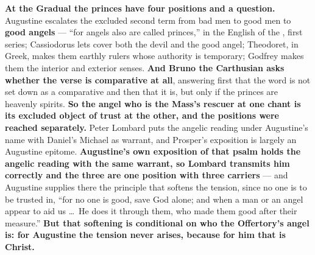 \textbf{At the Gradual the princes have four positions and a question.}
Augustine escalates the excluded second term from bad men to good men to
\textbf{good angels} --- ``for angels also are called princes,'' in the English
of the , first series; Cassiodorus lets
 cover both the devil and the good angel; Theodoret, in Greek,
makes them earthly rulers whose authority is temporary; Godfrey makes them the
interior and exterior senses. \textbf{And Bruno the Carthusian asks whether the
verse is comparative at all}, answering first that the word is not set down as a
comparative and then that it is, but only if the princes are heavenly spirits. \textbf{So the angel who is the Mass's rescuer at
one chant is its excluded object of trust at the other, and the positions were
reached separately.} Peter Lombard puts the angelic reading under Augustine's
name with Daniel's Michael as warrant, and Prosper's exposition is largely an
Augustine epitome. \textbf{Augustine's own exposition of that psalm holds the
angelic reading with the same warrant, so Lombard transmits him correctly and
the three are one position with three carriers} --- and Augustine supplies there
the principle that softens the tension, since no one is to be trusted in, ``for
no one is good, save God alone; and when a man or an angel appear to aid us
\dots\ He does it through them, who made them good after their measure.''
\textbf{But that softening is conditional on who the Offertory's angel is: for
Augustine the tension never arises, because for him that  is
Christ.}

